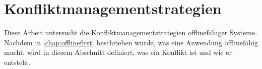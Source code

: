 %
%

%
%

%
%


%
%
\section{Konfliktmanagementstrategien}
Diese Arbeit untersucht die Konfliktmanagementstrategien offlinefähiger Systeme.
Nachdem in \autoref{chap:offlinefirst} beschrieben wurde, was eine Anwendung offlinefähig macht, wird in diesem Abschnitt definiert, was ein Konflikt ist und wie er entsteht.
%



